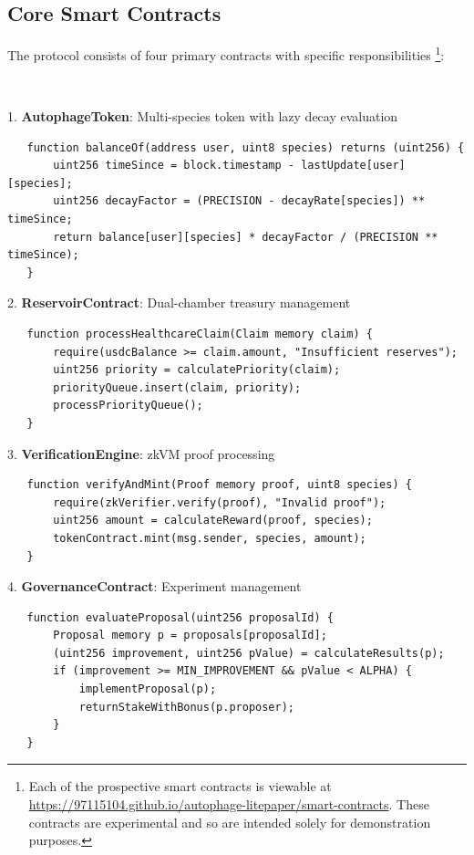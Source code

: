 \documentclass[11pt,letterpaper]{article}
\begin{document}
\subsection{Core Smart Contracts}

The protocol consists of four primary contracts with specific responsibilities \footnote{Each of the prospective smart contracts is viewable at \url{https://97115104.github.io/autophage-litepaper/smart-contracts}. These contracts are experimental and so are intended solely for demonstration purposes.}:

~

1. \textbf{AutophageToken}: Multi-species token with lazy decay evaluation
   \begin{verbatim}
   function balanceOf(address user, uint8 species) returns (uint256) {
       uint256 timeSince = block.timestamp - lastUpdate[user][species];
       uint256 decayFactor = (PRECISION - decayRate[species]) ** timeSince;
       return balance[user][species] * decayFactor / (PRECISION ** timeSince);
   }
   \end{verbatim}

2. \textbf{ReservoirContract}: Dual-chamber treasury management
   \begin{verbatim}
   function processHealthcareClaim(Claim memory claim) {
       require(usdcBalance >= claim.amount, "Insufficient reserves");
       uint256 priority = calculatePriority(claim);
       priorityQueue.insert(claim, priority);
       processPriorityQueue();
   }
   \end{verbatim}

3. \textbf{VerificationEngine}: zkVM proof processing
   \begin{verbatim}
   function verifyAndMint(Proof memory proof, uint8 species) {
       require(zkVerifier.verify(proof), "Invalid proof");
       uint256 amount = calculateReward(proof, species);
       tokenContract.mint(msg.sender, species, amount);
   }
   \end{verbatim}

4. \textbf{GovernanceContract}: Experiment management
   \begin{verbatim}
   function evaluateProposal(uint256 proposalId) {
       Proposal memory p = proposals[proposalId];
       (uint256 improvement, uint256 pValue) = calculateResults(p);
       if (improvement >= MIN_IMPROVEMENT && pValue < ALPHA) {
           implementProposal(p);
           returnStakeWithBonus(p.proposer);
       }
   }
   \end{verbatim}
\end{document}
